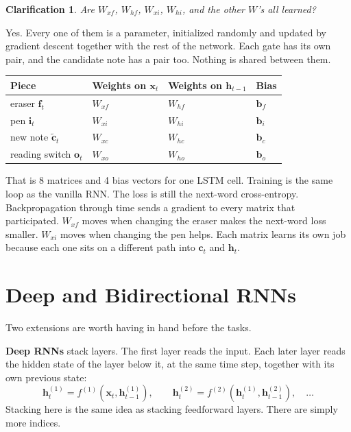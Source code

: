 \documentclass[11pt]{article}
\newtheorem*{clarification}{Clarification}
\begin{document}
\begin{clarification}
Are \(W_{xf}\), \(W_{hf}\), \(W_{xi}\), \(W_{hi}\), and the other \(W\)'s
all learned?
\end{clarification}

Yes. Every one of them is a parameter, initialized randomly and updated by
gradient descent together with the rest of the network. Each gate has its
own pair, and the candidate note has a pair too. Nothing is shared between
them.

\begin{center}
\begin{tabular}{@{}llll@{}}
\toprule
Piece & Weights on \(\mathbf{x}_t\) & Weights on \(\mathbf{h}_{t-1}\) & Bias \\
\midrule
eraser \(\mathbf{f}_t\) & \(W_{xf}\) & \(W_{hf}\) & \(\mathbf{b}_f\) \\
pen \(\mathbf{i}_t\) & \(W_{xi}\) & \(W_{hi}\) & \(\mathbf{b}_i\) \\
new note \(\tilde{\mathbf{c}}_t\) & \(W_{xc}\) & \(W_{hc}\) & \(\mathbf{b}_c\) \\
reading switch \(\mathbf{o}_t\) & \(W_{xo}\) & \(W_{ho}\) & \(\mathbf{b}_o\) \\
\bottomrule
\end{tabular}
\end{center}

That is 8 matrices and 4 bias vectors for one LSTM cell. Training is the
same loop as the vanilla RNN. The loss is still the next-word
cross-entropy. Backpropagation through time sends a gradient to every
matrix that participated. \(W_{xf}\) moves when changing the eraser makes
the next-word loss smaller. \(W_{xi}\) moves when changing the pen helps.
Each matrix learns its own job because each one sits on a different path
into \(\mathbf{c}_t\) and \(\mathbf{h}_t\).

\section{Deep and Bidirectional RNNs}

Two extensions are worth having in hand before the tasks.

\textbf{Deep RNNs} stack layers. The first layer reads the input. Each
later layer reads the hidden state of the layer below it, at the same time
step, together with its own previous state:
\[
\mathbf{h}_t^{(1)}
=
f^{(1)}(\mathbf{x}_t,\mathbf{h}_{t-1}^{(1)}),
\qquad
\mathbf{h}_t^{(2)}
=
f^{(2)}(\mathbf{h}_t^{(1)},\mathbf{h}_{t-1}^{(2)}),
\quad\ldots
\]
Stacking here is the same idea as stacking feedforward layers. There are
simply more indices.
\end{document}
